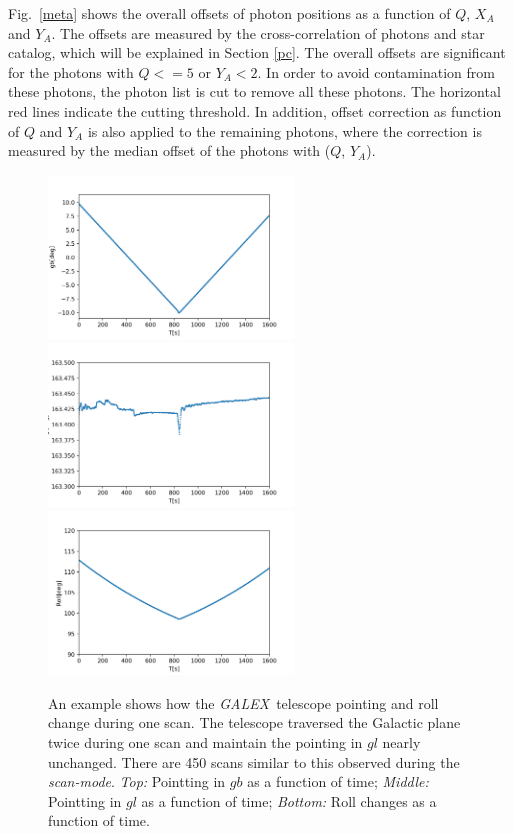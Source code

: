 \documentclass[12pt, preprint]{aastex}
\newcommand{\project}[1]{\textsl{#1}}
\newcommand{\galex}{\project{GALEX}}
\newcommand{\scanmode}{\project{scan-mode}}
\begin{document}
Fig.~\ref{meta} shows the overall offsets of photon positions as a function of $Q$, $X_A$ and $Y_A$.
The offsets are measured by the cross-correlation of photons and star catalog, which will be explained in Section \ref{pc}.
The overall offsets are significant for the photons with $Q<=5$ or $Y_A<2$.
In order to avoid contamination from these photons, the photon list is cut to remove all these photons.
The horizontal red lines indicate the cutting threshold.
In addition, offset correction as function of $Q$ and $Y_A$ is also applied to the remaining photons, where the correction is measured by the median offset of the photons with ($Q$, $Y_A$).

\begin{figure}[p]
\begin{center}
\includegraphics[width=0.58\textwidth]{figures/01634_0001-gb}
\includegraphics[width=0.58\textwidth]{figures/01634_0001-gl}
\includegraphics[width=0.58\textwidth]{figures/01634_0001-roll}
\end{center}
\caption{%
  \label{telescope}
  An example shows how the \galex\ telescope pointing and roll change during one scan.
  The telescope traversed the Galactic plane twice during one scan and maintain the pointing in $gl$ nearly unchanged.
  There are 450 scans similar to this observed during the \scanmode. 
  \emph{Top:}  Pointting in $gb$ as a function of time;
  \emph{Middle:} Pointting in $gl$ as a function of time;
  \emph{Bottom:} Roll changes as a function of time.
}
\end{figure}
\end{document}
